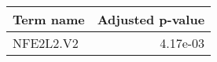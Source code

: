 \begin{tabular}{lr}
\toprule
 Term name &  Adjusted p-value \\
\midrule
 NFE2L2.V2 &          4.17e-03 \\
\bottomrule
\end{tabular}
